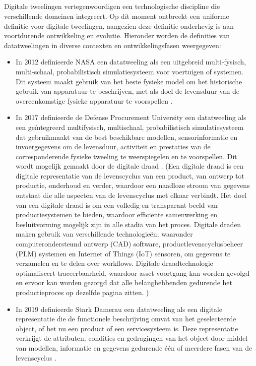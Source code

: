 \subsection{}
Digitale tweelingen vertegenwoordigen een technologische discipline die verschillende domeinen integreert. Op dit moment ontbreekt een uniforme definitie voor digitale tweelingen, aangezien deze definitie onderhevig is aan voortdurende ontwikkeling en evolutie. \autocite{Guo_2022}
Hieronder worden de definities van datatweelingen in diverse contexten en ontwikkelingsfasen weergegeven:
\begin{itemize}
    \item In 2012 definieerde NASA een datatweeling als een uitgebreid multi-fysisch, multi-schaal, probabilistisch simulatiesysteem voor voertuigen of systemen. Dit systeem maakt gebruik van het beste fysieke model om het historische gebruik van apparatuur te beschrijven, met als doel de levensduur van de overeenkomstige fysieke apparatuur te voorspellen \autocite{Guo_2022}.
    \item In 2017 definieerde de Defense Procurement University een datatweeling als een geïntegreerd multifysisch, multischaal, probabilistisch simulatiesysteem dat gebruikmaakt van de best beschikbare modellen, sensorinformatie en invoergegevens om de levensduur, activiteit en prestaties van de corresponderende fysieke tweeling te weerspiegelen en te voorspellen. Dit wordt mogelijk gemaakt door de digitale draad \autocite{Guo_2022}. (Een digitale draad is een digitale representatie van de levenscyclus van een product, van ontwerp tot productie, onderhoud en verder, waardoor een naadloze stroom van gegevens ontstaat die alle aspecten van de levenscyclus met elkaar verbindt. Het doel van een digitale draad is om een volledig en transparant beeld van productiesystemen te bieden, waardoor efficiënte samenwerking en besluitvorming mogelijk zijn in alle stadia van het proces. Digitale draden maken gebruik van verschillende technologieën, waaronder computerondersteund ontwerp (CAD) software, productlevenscyclusbeheer (PLM) systemen en Internet of Things (IoT) sensoren, om gegevens te verzamelen en te delen over workflows. Digitale draadtechnologie optimaliseert traceerbaarheid, waardoor asset-voortgang kan worden gevolgd en ervoor kan worden gezorgd dat alle belanghebbenden gedurende het productieproces op dezelfde pagina zitten. \autocite{China2023})
    \item In 2019 definieerde Stark Damerau een datatweeling als een digitale representatie die de functionele beschrijving omvat van het geselecteerde object, of het nu een product of een servicesysteem is. Deze representatie verkrijgt de attributen, condities en gedragingen van het object door middel van modellen, informatie en gegevens gedurende één of meerdere fasen van de levenscyclus \autocite{Guo_2022}.

\end{itemize}
